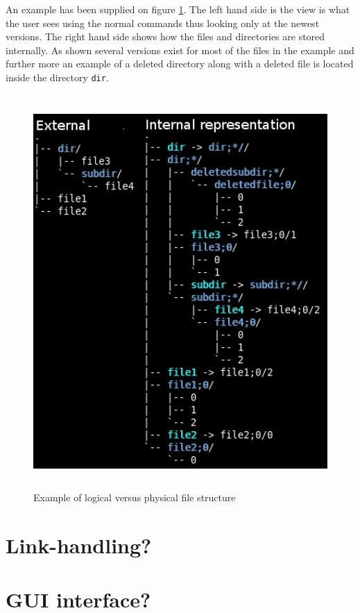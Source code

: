\documentclass[12pt]{article}
\begin{document}
An example has been supplied on figure \ref{structurefig}. The left hand
side is the view is what the user sees using the normal commands thus
looking only at the newest versions. The right hand side shows how the
files and directories are stored internally. As shown several versions
exist for most of the files in the example and further more an example of
a deleted directory along with a deleted file is located inside the
directory \texttt{dir}.

\begin{figure}
\begin{center}
\includegraphics[height=150mm]{filestructure.png}
\end{center}
\caption{Example of logical versus physical file structure}
\label{structurefig}
\end{figure}

\section{Link-handling?}

\section{GUI interface?}
\end{document}

